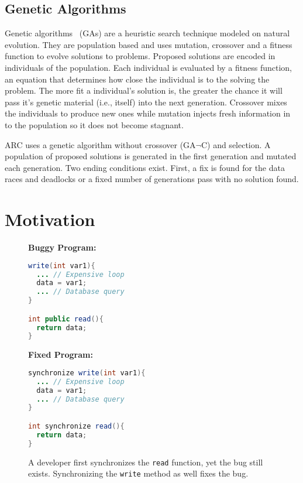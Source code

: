 \documentclass[runningheads,a4paper]{llncs}
\begin{document}
\subsection{Genetic Algorithms}
\label{sec:genetic_algorithms}

Genetic algorithms~\cite{GA92} (GAs) are a heuristic search technique modeled on natural evolution.  They are population based and uses mutation, crossover and a fitness function to evolve solutions to problems. Proposed solutions are encoded in individuals of the population. Each individual is evaluated by a fitness function, an equation that determines how close the individual is to the solving the problem. The more fit a individual's solution is, the greater the chance it will pass it's genetic material (i.e., itself) into the next generation. Crossover mixes the individuals to produce new ones while mutation injects fresh information in to the population so it does not become stagnant.

ARC uses a genetic algorithm without crossover (GA$\neg$C) and selection. A population of proposed solutions is generated in the first generation and mutated each generation. Two ending conditions exist.  First, a fix is found for the data races and deadlocks or a fixed number of generations pass with no solution found.



\section{Motivation}
\label{sec:motivation}

\begin{figure}[t!]
\begin{minipage}{5cm}
\footnotesize{\textbf{Buggy Program:}}
\begin{lstlisting}[language=Java, morekeywords={synchronize}]
write(int var1){
  ... // Expensive loop
  data = var1;
  ... // Database query
}

int public read(){
  return data;
}
\end{lstlisting}
\end{minipage}\hfill
\begin{minipage}{5cm}
\footnotesize{\textbf{Fixed Program:}}
\begin{lstlisting}[language=Java, morekeywords={synchronize}]
synchronize write(int var1){
  ... // Expensive loop
  data = var1;
  ... // Database query
}

int synchronize read(){
  return data;
}
\end{lstlisting}
\end{minipage}
\caption{A developer first synchronizes the \texttt{read} function, yet the bug
still exists. Synchronizing the \texttt{write} method as well fixes the bug.}
\label{fig:fixed_sample_datarace}
\end{figure}
\end{document}
